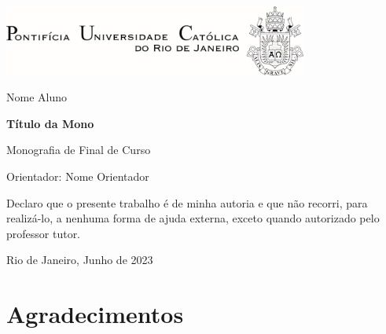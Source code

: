 \documentclass[12pt,openright,twoside,a4paper,brazil,english,emptypage,openany]{abntex2}
\begin{document}
\pretextual
{}

\setlength{\parskip}{10pt}

\pagestyle{fancy}%

\renewcommand{\chaptermark}[1]{\markboth{#1}{}}
\renewcommand{\sectionmark}[1]{\markright{#1}{}}

\fancyhf{}%
\fancyhead[RO]{\textit{\nouppercase{\newlinetospace{{\leftmark}}}}}


\flushright
\thispagestyle{empty}%
\includegraphics[width=10cm,right]{logo_puc.png}

\vspace{20pt}

\large{Nome Aluno}

\vspace{100pt}

\Large{\textbf{\sffamily Título da Mono}}

\vspace{90pt}

\normalsize
Monografia de Final de Curso

\vspace{2pt}

Orientador: Nome Orientador

\vspace{40pt}

\centering

Declaro que o presente trabalho é de minha autoria e que não recorri, para realizá-lo, a nenhuma forma de ajuda externa, exceto quando autorizado pelo professor tutor.

\vspace{60pt}

Rio de Janeiro,
\wl
Junho de 2023

\flushleft
\pagebreak


\section*{Agradecimentos}
\justifying
\end{document}
